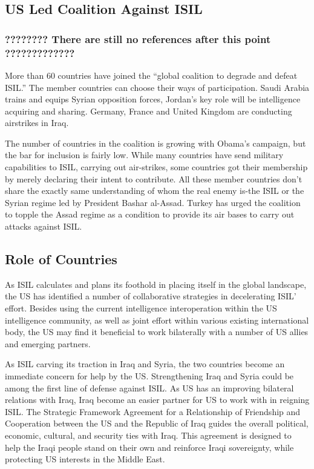 \documentclass{report}
\begin{document}
\subsection{US Led Coalition Against ISIL}

\subsubsection{????????   There are still no references after this point ?????????????}

More than 60 countries have joined the \enquote{global coalition to degrade and defeat ISIL.} The member countries can choose their ways of participation.  Saudi Arabia trains and equips Syrian opposition forces, Jordan’s key role will be intelligence acquiring and sharing. Germany, France and United Kingdom are conducting airstrikes in Iraq. 

The number of countries in the coalition is growing with Obama’s campaign, but the bar for inclusion is fairly low. While many countries have send military capabilities to ISIL, carrying out air-strikes, some countries got their membership by merely declaring their intent to contribute. All these member countries don’t share the exactly same understanding of whom the real enemy is-the ISIL or the Syrian regime led by President Bashar al-Assad. Turkey has urged the coalition to topple the Assad regime as a condition to provide its air bases to carry out attacks against ISIL. 

\subsection{Role of Countries}

As ISIL calculates and plans its foothold in placing itself in the global landscape, the US has identified a number of collaborative strategies in decelerating ISIL’ effort. Besides using the current intelligence interoperation within the US intelligence community, as well as joint effort within various existing international body, the US may find it beneficial to work bilaterally with a number of US allies and emerging partners.

As ISIL carving its traction in Iraq and Syria, the two countries become an immediate concern for help by the US. Strengthening Iraq and Syria could be among the first line of defense against ISIL. As US has an improving bilateral relations with Iraq, Iraq become an easier partner for US to work with in reigning ISIL. The Strategic Framework Agreement for a Relationship of Friendship and Cooperation between the US and the Republic of Iraq guides the overall political, economic, cultural, and security ties with Iraq.  This agreement is designed to help the Iraqi people stand on their own and reinforce Iraqi sovereignty, while protecting US interests in the Middle East. 
\end{document}
